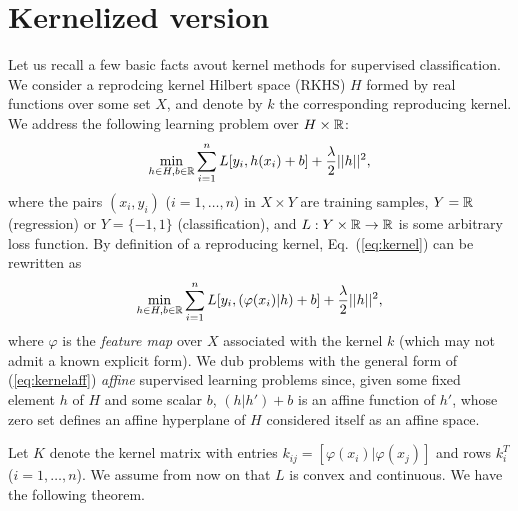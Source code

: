 \documentclass[12pt,letterpaper]{article}
\begin{document}
\section{Kernelized version}
Let us recall a few basic facts avout kernel methods for supervised
classification. We consider a reprodcing kernel Hilbert space (RKHS)
$H$ formed by real functions over some set
$X$, and denote by $k$ the corresponding reproducing kernel. We
address the following learning problem over $H\times\mathbb{R}$:
\begin{equation}
\min_{h\in H,b\in\mathbb{R}}
\sum_{i=1}^n L[y_i,h(x_i)+b] + \frac{\lambda}{2}||h||^2,
\label{eq:kernel}
\end{equation}
where the pairs $(x_i,y_i)$ ($i=1,\ldots,n$) in $X\times Y$ are
training samples, $Y=\mathbb{R}$ (regression) or $Y=\{-1,1\}$
(classification), and $L: Y\times \mathbb{R}\rightarrow\mathbb{R}$ is some arbitrary
loss function. By definition of a reproducing kernel,
Eq.~(\ref{eq:kernel}) can be rewritten as
\begin{equation}
\min_{h\in H,b\in\mathbb{R}}
\sum_{i=1}^n L[y_i,( \varphi(x_i)|h)+b] +
\frac{\lambda}{2}||h||^2,
\label{eq:kernelaff}
\end{equation}
where $\varphi$ is the {\em feature map} over $X$ associated with the
kernel $k$ (which may not admit a known explicit form). We dub
problems with the general form of (\ref{eq:kernelaff}) {\em affine}
supervised learning problems since, given some fixed element $h$ of
$H$ and some scalar $b$, $(h|h')+b$ is an affine function of $h'$,
whose zero set defines an affine hyperplane of $H$ considered itself
as an affine space.
 
 
Let $K$ denote the kernel matrix with entries $k_{ij}=[\varphi(x_i)|
\varphi(x_j)]$ and rows $k_i^T$ ($i=1,\ldots,n$). We assume from now
on that $L$ is convex and continuous. We have the following theorem.
 
\end{document}
